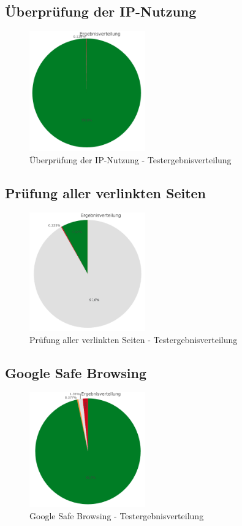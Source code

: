 \subsection{Überprüfung der IP-Nutzung}
\begin{figure}[H]
  \centering
  \includegraphics[width=5cm]{images/stats/diaipscan}
  \caption{Überprüfung der IP-Nutzung - Testergebnisverteilung}
  \label{fig:diaipscan}
\end{figure}

\subsection{Prüfung aller verlinkten Seiten}
\begin{figure}[H]
  \centering
  \includegraphics[width=5cm]{images/stats/dialinkchecker}
  \caption{Prüfung aller verlinkten Seiten - Testergebnisverteilung}
  \label{fig:dialinkchecker}
\end{figure}

\subsection{Google Safe Browsing}
\begin{figure}[H]
  \centering
  \includegraphics[width=5cm]{images/stats/diagoogle}
  \caption{Google Safe Browsing - Testergebnisverteilung}
  \label{fig:diagoogle}
\end{figure}

